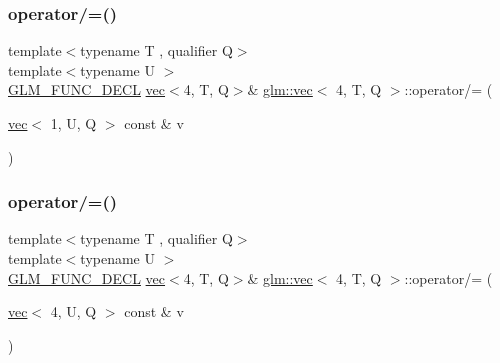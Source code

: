 \subsubsection{\texorpdfstring{operator/=()}{operator/=()}\hspace{0.1cm}{\footnotesize\ttfamily [2/6]}}
{\footnotesize\ttfamily template$<$typename T , qualifier Q$>$ \\
template$<$typename U $>$ \\
\hyperlink{setup_8hpp_ab2d052de21a70539923e9bcbf6e83a51}{G\+L\+M\+\_\+\+F\+U\+N\+C\+\_\+\+D\+E\+CL} \hyperlink{structglm_1_1vec}{vec}$<$4, T, Q$>$\& \hyperlink{structglm_1_1vec}{glm\+::vec}$<$ 4, T, Q $>$\+::operator/= (\begin{DoxyParamCaption}\item[{\hyperlink{structglm_1_1vec}{vec}$<$ 1, U, Q $>$ const \&}]{v }\end{DoxyParamCaption})}

\mbox{\label{structglm_1_1vec_3_014_00_01_t_00_01_q_01_4_aba90aef1a5d08c44f2ca6be9684bf1cd}} 
\subsubsection{\texorpdfstring{operator/=()}{operator/=()}\hspace{0.1cm}{\footnotesize\ttfamily [3/6]}}
{\footnotesize\ttfamily template$<$typename T , qualifier Q$>$ \\
template$<$typename U $>$ \\
\hyperlink{setup_8hpp_ab2d052de21a70539923e9bcbf6e83a51}{G\+L\+M\+\_\+\+F\+U\+N\+C\+\_\+\+D\+E\+CL} \hyperlink{structglm_1_1vec}{vec}$<$4, T, Q$>$\& \hyperlink{structglm_1_1vec}{glm\+::vec}$<$ 4, T, Q $>$\+::operator/= (\begin{DoxyParamCaption}\item[{\hyperlink{structglm_1_1vec}{vec}$<$ 4, U, Q $>$ const \&}]{v }\end{DoxyParamCaption})}

\mbox{\label{structglm_1_1vec_3_014_00_01_t_00_01_q_01_4_ab603e1376b20ee1ba7060973d0028adb}} 
